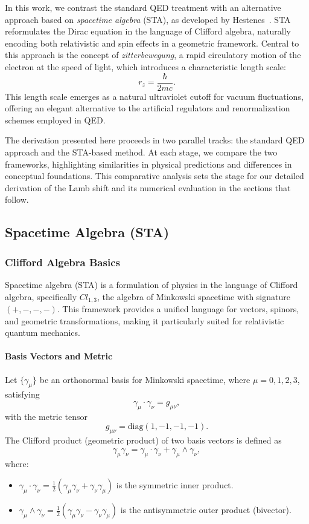 \documentclass[12pt]{article}
\begin{document}
In this work, we contrast the standard QED treatment with an alternative approach based on \emph{spacetime algebra} (STA), as developed by Hestenes~\cite{Hestenes1990}. STA reformulates the Dirac equation in the language of Clifford algebra, naturally encoding both relativistic and spin effects in a geometric framework. Central to this approach is the concept of \emph{zitterbewegung}, a rapid circulatory motion of the electron at the speed of light, which introduces a characteristic length scale:
\[
r_z = \frac{\hbar}{2mc}.
\]
This length scale emerges as a natural ultraviolet cutoff for vacuum fluctuations, offering an elegant alternative to the artificial regulators and renormalization schemes employed in QED.

The derivation presented here proceeds in two parallel tracks: the standard QED approach and the STA-based method. At each stage, we compare the two frameworks, highlighting similarities in physical predictions and differences in conceptual foundations. This comparative analysis sets the stage for our detailed derivation of the Lamb shift and its numerical evaluation in the sections that follow.

\subsection{Spacetime Algebra (STA)}\label{subsec:sta}

\subsubsection{Clifford Algebra Basics}\label{subsec:clifforalg}

Spacetime algebra (STA) is a formulation of physics in the language of Clifford algebra, specifically \(Cl_{1,3}\), the algebra of Minkowski spacetime with signature \((+,-,-,-)\). This framework provides a unified language for vectors, spinors, and geometric transformations, making it particularly suited for relativistic quantum mechanics.

\paragraph{Basis Vectors and Metric}
Let \(\{\gamma_\mu\}\) be an orthonormal basis for Minkowski spacetime, where \(\mu=0,1,2,3\), satisfying
\[
\gamma_\mu \cdot \gamma_\nu = g_{\mu\nu},
\]
with the metric tensor
\[
g_{\mu\nu} = \mathrm{diag}(1,-1,-1,-1).
\]
The Clifford product (geometric product) of two basis vectors is defined as
\[
\gamma_\mu \gamma_\nu = \gamma_\mu \cdot \gamma_\nu + \gamma_\mu \wedge \gamma_\nu,
\]
where:
\begin{itemize}
    \item \(\gamma_\mu \cdot \gamma_\nu = \frac{1}{2}(\gamma_\mu \gamma_\nu + \gamma_\nu \gamma_\mu)\) is the symmetric inner product.
    \item \(\gamma_\mu \wedge \gamma_\nu = \frac{1}{2}(\gamma_\mu \gamma_\nu - \gamma_\nu \gamma_\mu)\) is the antisymmetric outer product (bivector).
\end{itemize}
\end{document}
